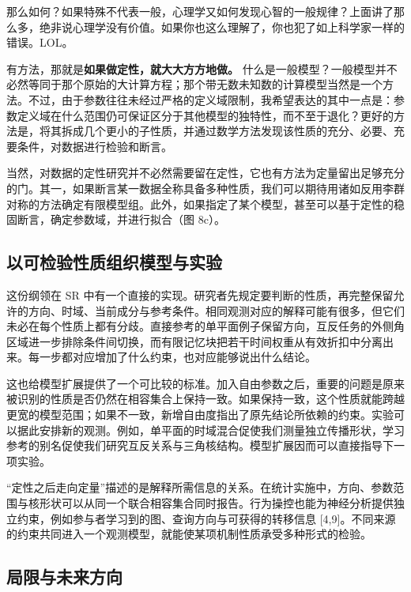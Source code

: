 \documentclass[11pt,a4paper]{article}
\begin{document}
那么如何？如果特殊不代表一般，心理学又如何发现心智的一般规律？上面讲了那么多，绝非说心理学没有价值。如果你也这么理解了，你也犯了如上科学家一样的错误。LOL。

有方法，那就是\textbf{如果做定性，就大大方方地做。}
什么是一般模型？一般模型并不必然等同于那个原始的大计算方程；那个带无数未知数的计算模型当然是一个方法。不过，由于参数往往未经过严格的定义域限制，我希望表达的其中一点是：参数定义域在什么范围仍可保证区分于其他模型的独特性，而不至于退化？更好的方法是，将其拆成几个更小的子性质，并通过数学方法发现该性质的充分、必要、充要条件，对数据进行检验和断言。

当然，对数据的定性研究并不必然需要留在定性，它也有方法为定量留出足够充分的门。其一，如果断言某一数据全称具备多种性质，我们可以期待用诸如反用李群对称的方法确定有限模型组。此外，如果指定了某个模型，甚至可以基于定性的稳固断言，确定参数域，并进行拟合（图
8c）。

\subsection{以可检验性质组织模型与实验}\label{ux4ee5ux53efux68c0ux9a8cux6027ux8d28ux7ec4ux7ec7ux6a21ux578bux4e0eux5b9eux9a8c}

这份纲领在 SR
中有一个直接的实现。研究者先规定要判断的性质，再完整保留允许的方向、时域、当前成分与参考条件。相同观测对应的解释可能有很多，但它们未必在每个性质上都有分歧。直接参考的单平面例子保留方向，互反任务的外侧角区域进一步排除条件间切换，而有限记忆块把若干时间权重从有效折扣中分离出来。每一步都对应增加了什么约束，也对应能够说出什么结论。

这也给模型扩展提供了一个可比较的标准。加入自由参数之后，重要的问题是原来被识别的性质是否仍然在相容集合上保持一致。如果保持一致，这个性质就能跨越更宽的模型范围；如果不一致，新增自由度指出了原先结论所依赖的约束。实验可以据此安排新的观测。例如，单平面的时域混合促使我们测量独立传播形状，学习参考的别名促使我们研究互反关系与三角核结构。模型扩展因而可以直接指导下一项实验。

“定性之后走向定量”描述的是解释所需信息的关系。在统计实施中，方向、参数范围与核形状可以从同一个联合相容集合同时报告。行为操控也能为神经分析提供独立约束，例如参与者学习到的图、查询方向与可获得的转移信息
{[}4,9{]}。不同来源的约束共同进入一个观测模型，就能使某项机制性质承受多种形式的检验。

\subsection{局限与未来方向}\label{ux5c40ux9650ux4e0eux672aux6765ux65b9ux5411}
\end{document}
